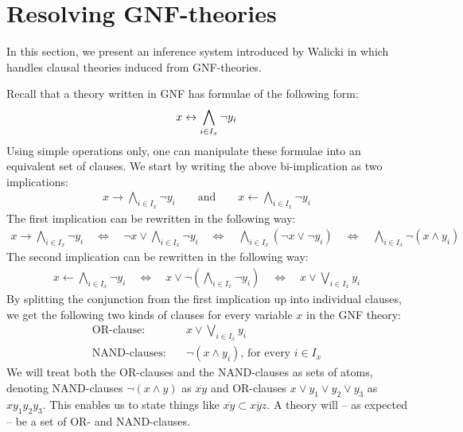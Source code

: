 

\section{Resolving GNF-theories}
\label{sec:Resolving GNF-theories}
In this section, we present an inference system introduced by Walicki in \cite{michal-completeness} which handles clausal theories induced from GNF-theories.

Recall that a theory written in GNF has formulae of the following form:
\begin{align}
  x \leftrightarrow \bigwedge_{i \in I_x} \neg y_i
\end{align}
Using simple operations only, one can manipulate these formulae into an equivalent set of clauses.
We start by writing the above bi-implication as two implications:
\begin{align}
  x \rightarrow \bigwedge_{i \in I_x} \neg y_i \quad\quad \text{and} \quad\quad x \leftarrow \bigwedge_{i \in I_x} \neg y_i
\end{align}
The first implication can be rewritten in the following way:
\begin{align}
  x \rightarrow \bigwedge_{i \in I_x} \neg y_i
  \quad\Leftrightarrow\quad \neg x \vee \bigwedge_{i \in I_x} \neg y_i
  \quad\Leftrightarrow\quad \bigwedge_{i \in I_x} (\neg x \vee \neg y_i)
  \quad\Leftrightarrow\quad \bigwedge_{i \in I_x} \neg (x \wedge y_i)
\end{align}
The second implication can be rewritten in the following way:
\begin{align}
  x \leftarrow \bigwedge_{i \in I_x} \neg y_i
  \quad\Leftrightarrow\quad x \vee \neg \left( \bigwedge_{i \in I_x} \neg y_i \right)
  \quad\Leftrightarrow\quad x \vee \bigvee_{i \in I_x} y_i
\end{align}
By splitting the conjunction from the first implication up into individual clauses, we get the following two kinds of clauses for every variable $x$ in the GNF theory:
\begin{align}
  \text{OR-clause:}&\quad x \vee \bigvee_{i \in I_x} y_i\\
  \text{NAND-clauses:}&\quad \neg (x \wedge y_i)\text{, for every }i \in I_x
\end{align}
We will treat both the OR-clauses and the NAND-clauses as sets of atoms, denoting NAND-clauses $\neg (x \wedge y)$ as $\overline{xy}$ and OR-clauses $x \vee y_1 \vee y_2 \vee y_3$ as $xy_1y_2y_3$.
This enables us to state things like $\overline{xy} \subset \overline{xyz}$.
A theory will -- as expected -- be a set of OR- and NAND-clauses.

